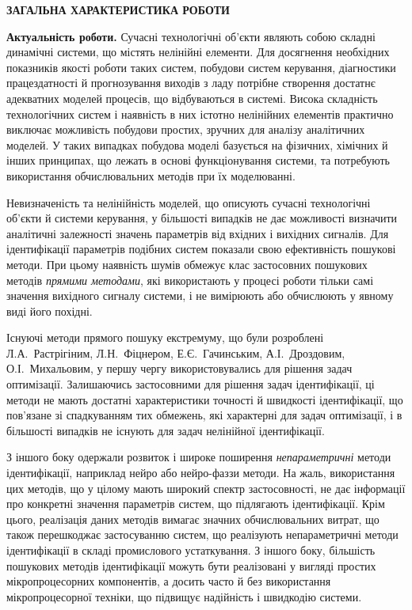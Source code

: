 \documentclass[a4paper,12pt]{atuaref}
\newcommand{\TermUse}[1]{\textit{#1}}
\newcommand{\xsect}[1]{\medskip\begin{center}\textbf{#1}\end{center}\medskip\penalty10000}
\begin{document}
\sloppy
\setcounter{page}{1}

\xsect{ЗАГАЛЬНА ХАРАКТЕРИСТИКА РОБОТИ}

\textbf{Актуальність роботи.}
Сучасні технологічні об'єкти являють собою складні динамічні
системи, що містять нелінійні елементи. Для досягнення необхідних
показників якості роботи таких систем, побудови систем керування,
діагностики працездатності й прогнозування виходів з ладу потрібне
створення достатнє адекватних моделей процесів, що відбуваються
в системі. Висока складність технологічних систем і наявність
в них істотно нелінійних елементів практично виключає
можливість побудови простих, зручних для аналізу аналітичних
моделей. У таких випадках побудова моделі базується на фізичних,
хімічних й інших принципах, що лежать в основі функціонування
системи, та потребують використання обчислювальних методів
при їх моделюванні.

Невизначеність та нелінійність моделей,
що описують сучасні  технологічні об'єкти
й системи керування, у більшості випадків не дає можливості  визначити
аналітичні залежності значень параметрів від вхідних і вихідних
сигналів.  Для ідентифікації параметрів подібних систем показали
свою ефективність пошукові методи.
При цьому наявність шумів обмежує клас
застосовних пошукових методів \TermUse{прямими методами},
які використають у процесі роботи тільки самі
значення вихідного сигналу системи,
і не вимірюють або обчислюють у явному виді його похідні.

Існуючі методи прямого пошуку екстремуму,
що були розроблені
Л.А.~Растрігіним,
Л.Н.~Фіцнером,
Е.Є.~Гачинським,
А.І.~Дроздовим,
О.І.~Михальовим,
у першу чергу використовувались для рішення задач оптимізації.
Залишаючись застосовними для рішення
задач ідентифікації, ці методи не мають достатні характеристики точності й
швидкості ідентифікації, що пов'язане зі спадкуванням тих обмежень, які
характерні для задач оптимізації, і в більшості випадків не існують для задач
нелінійної ідентифікації.

З іншого боку одержали розвиток і широке поширення \textit{непараметричні}
методи ідентифікації, наприклад нейро або нейро-фаззи методи.
На жаль, використання цих методів, що у цілому мають широкий
спектр застосовності, не дає інформації про конкретні значення параметрів
систем, що підлягають ідентифікації. Крім цього, реалізація даних методів вимагає значних
обчислювальних витрат, що також перешкоджає застосуванню систем,
що реалізують непараметричні методи ідентифікації в складі промислового устаткування.
З іншого боку, більшість пошукових методів ідентифікації
можуть бути реалізовані у
вигляді простих мікропроцесорних компонентів,
а досить часто й без використання
мікропроцесорної техніки, що підвищує надійність і швидкодію системи.
\end{document}
